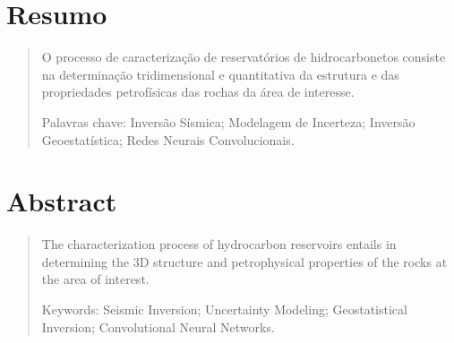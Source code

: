 \chapter*{Resumo}


\begin{quotation}

\noindent O processo de caracterização de reservatórios de hidrocarbonetos
consiste na determinação tridimensional e quantitativa da estrutura e das
propriedades petrofísicas das rochas da área de interesse.

\vspace*{0.5cm}

\noindent Palavras chave: Inversão Sísmica; Modelagem de Incerteza; Inversão Geoestatística; Redes Neurais Convolucionais.

\end{quotation}


\chapter*{Abstract}


\begin{quotation}

\noindent 

The characterization process of hydrocarbon reservoirs entails in determining
the 3D structure and petrophysical properties of the rocks at the area of
interest.

\vspace*{0.5cm}

\noindent Keywords: Seismic Inversion; Uncertainty Modeling; Geostatistical
Inversion; Convolutional Neural Networks.

\end{quotation}

\null

